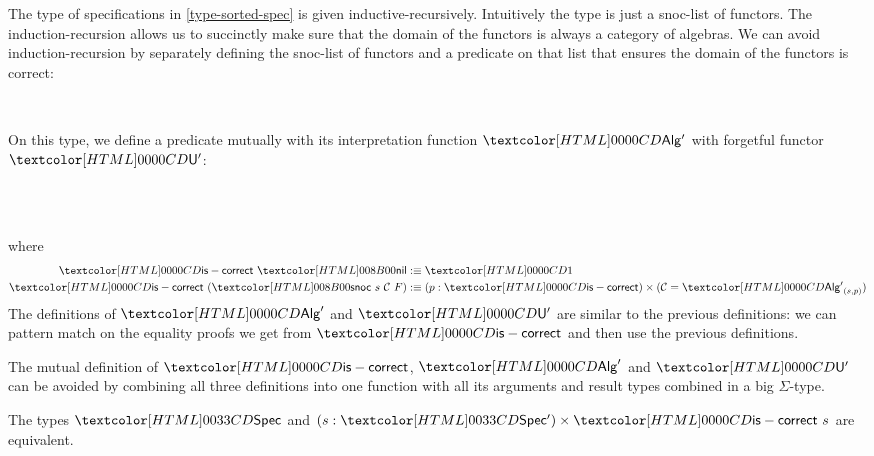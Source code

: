 The type of specifications in \cref{type-sorted-spec} is given
inductive-recursively. Intuitively the type is just a snoc-list of
functors. The induction-recursion allows us to succinctly make sure
that the domain of the functors is always a category of algebras. We
can avoid induction-recursion by separately defining the snoc-list of
functors and a predicate on that list that ensures the domain of the
functors is correct:

\begin{definition}
  \begin{datatype}{\specaltty}{\Type}
    \constr{\specaltnil}{\specaltty} \\
    \constr{\specaltsnoc}{\specaltty \to (\Cc : \Cat)\ (\Func{\Cc}{\Type}) \to \specaltty}
  \end{datatype}
  On this type, we define a predicate mutually with its interpretation
  function $\Algalt$ with forgetful functor $\Undalt$:
  \begin{sorts}
    \functy{\specaltiscorrect}{\specaltty \to \Type} \\
     \\
  \end{sorts}
  where
  \begin{align*}
    \specaltiscorrect\ \specaltnil &\ddefeq \unitty \\
    \specaltiscorrect\ (\specaltsnoc\ s\ \Cc\ F) &\ddefeq (p : \specaltiscorrect) \times (\Cc = \Algalt_{(s,p)})
  \end{align*}
  The definitions of $\Alg'$ and $\Und'$ are similar to the previous
  definitions: we can pattern match on the equality proofs we get from
  $\specaltiscorrect$ and then use the previous definitions.
\end{definition}

\begin{remark}
  The mutual definition of $\specaltiscorrect$, $\Alg'$ and $\Und'$
  can be avoided by combining all three definitions into one function
  with all its arguments and result types combined in a big
  $\Sigma$-type.
\end{remark}

\begin{proposition}
  The types $\specty$ and $(s : \specaltty) \times \specaltiscorrect\ s$ are equivalent.
\end{proposition}

